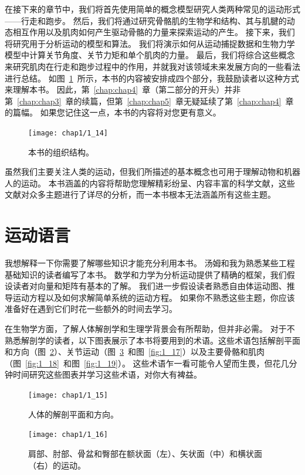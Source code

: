 在接下来的章节中，我们将首先使用简单的概念模型研究人类两种常见的运动形式——行走和跑步。
然后，我们将通过研究骨骼肌的生物学和结构、其与肌腱的动态相互作用以及肌肉如何产生驱动骨骼的力量来探索运动的产生。
接下来，我们将研究用于分析运动的模型和算法。
我们将演示如何从运动捕捉数据和生物力学模型中计算关节角度、关节力矩​​和单个肌肉的力量。
最后，我们将综合这些概念来研究肌肉在行走和跑步过程中的作用，并就我对该领域未来发展方向的一些看法进行总结。
如图~\ref{fig:1_14}~所示，本书的内容被安排成四个部分，我鼓励读者以这种方式来理解本书。
因此，第~\ref{chap:chap4}~章（第二部分的开头）并非第~\ref{chap:chap3}~章的续篇，但第~\ref{chap:chap5}~章无疑延续了第~\ref{chap:chap4}~章的篇幅。
如果您记住这一点，本书的内容将对您更有意义。


\begin{figure}[!htb]
	\centering
	\texttt{[image: chap1/1\_14]}
	\caption{本书的组织结构。 \label{fig:1_14}}
\end{figure}



虽然我们主要关注人类的运动，但我们所描述的基本概念也可用于理解动物和机器人的运动。
本书涵盖的内容将帮助您理解精彩纷呈、内容丰富的科学文献，这些文献对众多主题进行了详尽的分析，而一本书根本无法涵盖所有​​这些主题。


\section{运动语言}

我想解释一下你需要了解哪些知识才能充分利用本书。
汤姆和我为熟悉某些工程基础知识的读者编写了本书。
数学和力学为分析运动提供了精确的框架，我们假设读者对向量和矩阵有基本的了解。
我们进一步假设读者熟悉自由体运动图、推导运动方程以及如何求解简单系统的运动方程。
如果你不熟悉这些主题，你应该准备好在遇到它们时花一些额外的时间去学习。


在生物学方面，了解人体解剖学和生理学背景会有所帮助，但并非必需。
对于不熟悉解剖学的读者，以下图表展示了本书将要用到的术语。这些术语包括解剖平面和方向（图~\ref{fig:1_15}）、关节运动（图~\ref{fig:1_16}~和图~\ref{fig:1_17}）以及主要骨骼和肌肉（图~\ref{fig:1_18}~和图~\ref{fig:1_19}）。
这些术语乍一看可能令人望而生畏，但花几分钟时间研究这些图表并学习这些术语，对你大有裨益。


\begin{figure}[!htb]
	\centering
	\texttt{[image: chap1/1\_15]}
	\caption{人体的解剖平面和方向。 \label{fig:1_15}}
\end{figure}


\begin{figure}[!htb]
	\centering
	\texttt{[image: chap1/1\_16]}
	\caption{肩部、肘部、骨盆和臀部在额状面（左）、矢状面（中）和横状面（右）的运动。 \label{fig:1_16}}
\end{figure}


